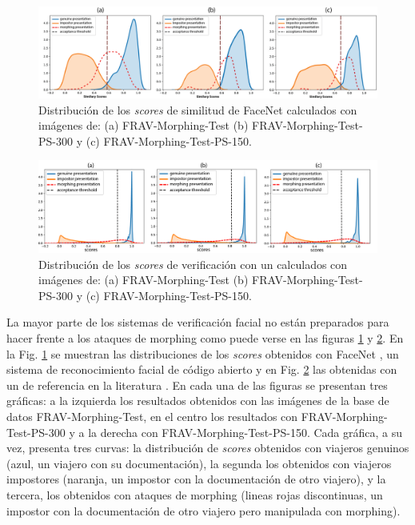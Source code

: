 \begin{figure}[t!]
    \centering
    \includegraphics[width=1\textwidth]{ch-sistemasABC/images/ch-morphing/COMPARATIVA_DE_LOS_SCORES_DE_FACE_NET.png}
    \caption{Distribución de los \textit{scores} de similitud de \Gls{FaceNet} \cite{schroff2015facenet} calculados con imágenes de: (a) \Gls{FRAV-Morphing-Test} (b) \Gls{FRAV-Morphing-Test-PS-300} y (c) \Gls{FRAV-Morphing-Test-PS-150}.}
    \label{fig:FaceNetProbabilities}
\end{figure}

\begin{figure}[t!]
    \centering
    \includegraphics[width=1\textwidth]{ch-sistemasABC/images/ch-morphing/COMPARATIVA_DE_LOS_SCORES_DE_LUXAND.png}
    \caption{Distribución de los \textit{scores} de verificación con un  calculados con imágenes de: (a) \Gls{FRAV-Morphing-Test} (b) \Gls{FRAV-Morphing-Test-PS-300} y (c) \Gls{FRAV-Morphing-Test-PS-150}.}
    \label{fig:LuxandProbabilities}
\end{figure}

La mayor parte de los sistemas de verificación facial no están preparados para hacer frente a los ataques de \gls{morphing} \cite{gomez2017your} \cite{spreeuwers2018towards} como puede verse en las figuras \ref{fig:FaceNetProbabilities} y \ref{fig:LuxandProbabilities}. En la Fig. \ref{fig:FaceNetProbabilities} se muestran las distribuciones de los \textit{scores} obtenidos con \gls{FaceNet} \cite{SandbergFaceNet}, un sistema de reconocimiento facial de código abierto y en Fig. \ref{fig:LuxandProbabilities} las obtenidas con un  de referencia en la literatura \cite{ferrara2014magic}. En cada una de las figuras se presentan tres gráficas: a la izquierda los resultados obtenidos con las imágenes de la base de datos \Gls{FRAV-Morphing-Test}, en el centro los resultados con \Gls{FRAV-Morphing-Test-PS-300} y a la derecha con \Gls{FRAV-Morphing-Test-PS-150}. Cada gráfica, a su vez, presenta tres curvas: la distribución de \textit{scores} obtenidos con viajeros genuinos (azul, un viajero con su documentación), la segunda los obtenidos con viajeros impostores (naranja, un impostor con la documentación de otro viajero), y la tercera, los obtenidos con ataques de \gls{morphing} (lineas rojas discontinuas, un impostor con la documentación de otro viajero pero manipulada con \gls{morphing}).


